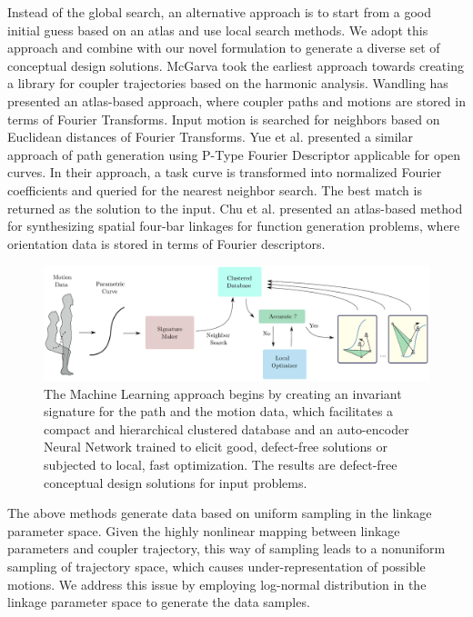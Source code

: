 \documentclass[twocolumn,10pt]{asme2ej}
\begin{document}
Instead of the global search, an alternative approach is to start from a good initial guess based on an atlas and use local search methods.
We adopt this approach and combine with our novel formulation to generate a diverse set of conceptual design solutions.
McGarva\cite{mcgarva1994} took the earliest approach towards creating a library for coupler trajectories based on the harmonic analysis.
Wandling\cite{wandling2000} has presented an atlas-based approach, where coupler paths and motions are stored in terms of Fourier Transforms.
Input motion is searched for neighbors based on Euclidean distances of Fourier Transforms.
Yue et al.\cite{yue-pathgen2011} presented a similar approach of path generation using P-Type Fourier Descriptor applicable for open curves.
In their approach, a task curve is transformed into normalized Fourier coefficients and queried for the nearest neighbor search.
The best match is returned as the solution to the input.
Chu et al.\cite{chu2010} presented an atlas-based method for synthesizing spatial four-bar linkages for function generation problems, where orientation data is stored in terms of Fourier descriptors.
\begin{figure}
\centering
\includegraphics[width=\textwidth]{figure/overall_approach.eps}
  \caption{The Machine Learning approach begins by creating an invariant signature for the path and the motion data, which facilitates a compact and hierarchical clustered database and an auto-encoder Neural Network trained to elicit good, defect-free solutions or subjected to local, fast optimization. The results are defect-free conceptual design solutions for input problems.}
\label{overallMethod}
\end{figure}
The above methods generate data based on uniform sampling in the linkage parameter space.
Given the highly nonlinear mapping between linkage parameters and coupler trajectory, this way of sampling leads to a nonuniform sampling of trajectory space, which causes under-representation of possible motions.
We address this issue by employing log-normal distribution in the linkage parameter space to generate the data samples.
\end{document}
